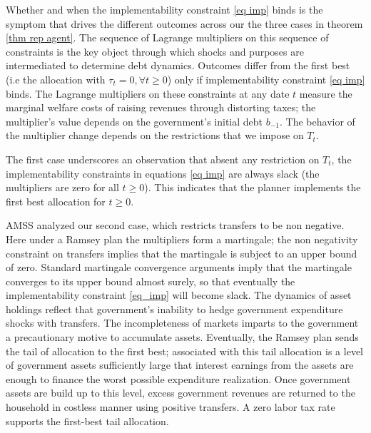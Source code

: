 \documentclass[thmsb,11pt]{article}
\begin{document}
Whether  and when the implementability constraint \eqref{eq imp}  binds  is the symptom  that drives the different outcomes across our the three cases in theorem  \ref{thm rep agent}.  The sequence of Lagrange multipliers on this sequence of  constraints is the key object through which
shocks and purposes are  intermediated to determine debt dynamics.  Outcomes  differ from the first best (i.e the allocation with $\tau_t=0, \forall t\geq0$) only if  implementability constraint  \eqref{eq imp} binds. The Lagrange multipliers on these constraints at any date $t$ measure
    the marginal welfare costs of raising revenues through distorting taxes;  the multiplier's  value depends on the government's initial debt
     $b_{-1}$.  The behavior of the multiplier change depends on the  restrictions that we impose on  $T_t$.

The first case underscores an observation that absent any restriction on $T_t$, the implementability  constraints in equations \eqref{eq imp} are  always slack (the multipliers are zero for all $t\geq 0$). This indicates that the  planner  implements the first best allocation for $t \geq 0$.

AMSS analyzed our second case, which restricts transfers to be non negative. Here under a Ramsey plan the multipliers
 form a  martingale;  the non negativity constraint on transfers implies that the martingale is subject to  an upper bound of zero.
  Standard martingale convergence arguments imply that the martingale converges to its upper bound almost surely, so that
  eventually the  implementability constraint \eqref{eq_imp} will become  slack. The dynamics of asset holdings reflect that  government's
   inability to hedge government expenditure shocks with transfers. The incompleteness of markets imparts to the government  a precautionary motive to accumulate assets. Eventually, the Ramsey plan sends the tail of allocation to  the first best; associated with this tail allocation
    is a level of government assets sufficiently large that  interest earnings from the assets are enough to finance the worst possible expenditure realization. Once government assets are build up to this level, excess government revenues  are returned to the household in  costless manner using positive transfers. A zero labor tax rate supports the first-best tail allocation.
\end{document}
